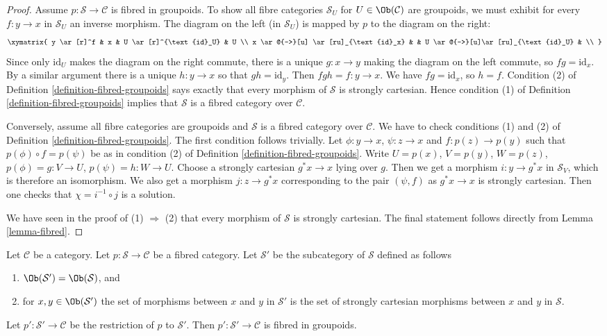 \begin{proof}
Assume $p : \mathcal{S} \to \mathcal{C}$ is fibred in groupoids.
To show all fibre categories $\mathcal{S}_U$ for
$U \in \Ob(\mathcal{C})$
are groupoids, we must exhibit for every $f : y \to x$ in $\mathcal{S}_U$ an
inverse morphism.  The diagram on the left (in $\mathcal{S}_U$) is mapped by
$p$ to the diagram on the right:
$$
\xymatrix{
y \ar[r]^f & x & U \ar[r]^{\text{id}_U} & U \\
x \ar@{-->}[u] \ar[ru]_{\text{id}_x} & &
U \ar@{-->}[u]\ar[ru]_{\text{id}_U} & \\
}
$$
Since only $\text{id}_U$ makes the diagram on the right commute, there is a
unique $g : x \to y$ making the diagram on the left commute, so
$fg = \text{id}_x$. By a similar argument there is a unique $h : y \to x$ so
that $gh = \text{id}_y$. Then $fgh = f : y \to x$.  We have $fg = \text{id}_x$,
so $h = f$. Condition (2) of Definition \ref{definition-fibred-groupoids} says
exactly that every morphism of $\mathcal{S}$ is strongly cartesian. Hence
condition (1) of Definition \ref{definition-fibred-groupoids} implies that
$\mathcal{S}$ is a fibred category over $\mathcal{C}$.

\medskip\noindent
Conversely, assume all fibre categories are groupoids and
$\mathcal{S}$ is a fibred category over $\mathcal{C}$.
We have to check conditions (1) and (2) of
Definition \ref{definition-fibred-groupoids}.
The first condition follows trivially. Let $\phi : y \to x$,
$\psi : z \to x$ and $f : p(z) \to p(y)$ such that
$p(\phi) \circ f = p(\psi)$ be as in condition (2) of
Definition \ref{definition-fibred-groupoids}.
Write $U = p(x)$, $V = p(y)$, $W = p(z)$, $p(\phi) = g : V \to U$,
$p(\psi) = h : W \to U$. Choose a strongly cartesian $g^*x \to x$
lying over $g$. Then we get a morphism $i : y \to g^*x$ in
$\mathcal{S}_V$, which is therefore an isomorphism. We
also get a morphism $j : z \to g^*x$ corresponding to
the pair $(\psi, f)$ as $g^*x \to x$ is strongly cartesian.
Then one checks that $\chi = i^{-1} \circ j$ is a solution.

\medskip\noindent
We have seen in the proof of (1) $\Rightarrow$ (2) that
every morphism of $\mathcal{S}$ is strongly cartesian.
The final statement follows directly from Lemma \ref{lemma-fibred}.
\end{proof}

\begin{lemma}
\label{lemma-fibred-gives-fibred-groupoids}
Let $\mathcal{C}$ be a category.
Let $p : \mathcal{S} \to \mathcal{C}$ be a fibred category.
Let $\mathcal{S}'$ be the subcategory of $\mathcal{S}$ defined
as follows
\begin{enumerate}
\item $\Ob(\mathcal{S}') = \Ob(\mathcal{S})$, and
\item for $x, y \in \Ob(\mathcal{S}')$ the set of morphisms between $x$
and $y$ in $\mathcal{S}'$ is the set of strongly cartesian morphisms between
$x$ and $y$ in $\mathcal{S}$.
\end{enumerate}
Let $p' : \mathcal{S}' \to \mathcal{C}$ be the restriction of $p$
to $\mathcal{S}'$. Then $p' : \mathcal{S}' \to \mathcal{C}$ is fibred
in groupoids.
\end{lemma}

